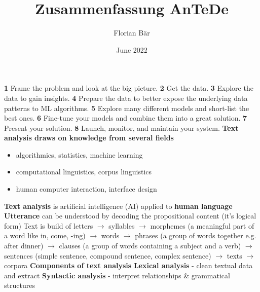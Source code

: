 \documentclass[8pt]{extarticle}
\title{Zusammenfassung AnTeDe}
\author{Florian Bär}
\date{June 2022}
\begin{document}

\begin{multicols*}{3}
[
]

\textbf{1} Frame the problem and look at the big picture.
\textbf{2} Get the data.
\textbf{3} Explore the data to gain insights.
\textbf{4} Prepare the data to better expose the underlying data patterns to ML algorithms.
\textbf{5} Explore many different models and short-list the best ones.
\textbf{6} Fine-tune your models and combine them into a great solution.
\textbf{7} Present your solution.
\textbf{8} Launch, monitor, and maintain your system.
\newline \textbf{Text analysis draws on knowledge from several fields}
\begin{itemize}
    \item algorithmics, statistics, machine learning
    \item computational linguistics, corpus linguistics
    \item human computer interaction, interface design
\end{itemize}
\textbf{Text analysis} is artificial intelligence (AI) applied to \textbf{human language}
\newline \textbf{Utterance} can be understood by decoding the propositional content (it's logical form)
\newline Text is build of letters $\rightarrow$ syllables $\rightarrow$ morphemes (a meaningful part of a word like in, come, -ing) $\rightarrow$ words $\rightarrow$ phrases (a group of words together e.g. after dinner) $\rightarrow$ clauses (a group of words containing a subject and a verb) $\rightarrow$ sentences (simple sentence, compound sentence, complex sentence) $\rightarrow$ texts $\rightarrow$ corpora
\newline \textbf{Components of text analysis}
\newline \textbf{Lexical analysis} - clean textual data and extract
\newline \textbf{Syntactic analysis} - interpret relationships \& grammatical structures

\end{multicols*}
\end{document}
